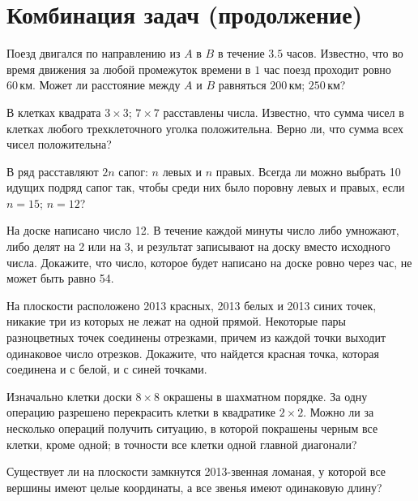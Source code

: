 
\section*{Комбинация задач (продолжение)}


\begin{problems}

\item 
Поезд двигался по направлению из $A$ в $B$ в течение $3.5$ часов.
Известно, что во время движения за любой промежуток времени в $1$ час поезд
проходит ровно $60\,\text{км}$.
Может ли расстояние между $A$ и $B$ равняться
\quad
\sp
$200\,\text{км}$;
\quad
\sp
$250\,\text{км}$?

\item 
В клетках квадрата
\quad
\sp $3 \times 3$;
\quad
\sp $7 \times 7$
\quad
расставлены числа.
Известно, что сумма чисел в клетках любого трехклеточного уголка положительна.
Верно ли, что сумма всех чисел положительна?

\item 
В ряд расставляют $2 n$ сапог: $n$ левых и $n$ правых.
Всегда ли можно выбрать 10 идущих подряд сапог так, чтобы среди них было
поровну левых и правых, если
\quad
\sp $n = 15$;
\quad
\sp $n = 12$?

\item 
На доске написано число 12.
В течение каждой минуты число либо умножают, либо делят на 2 или на 3, и
результат записывают на доску вместо исходного числа.
Докажите, что число, которое будет написано на доске ровно через час, не может
быть равно 54.

\item 
На плоскости расположено 2013 красных, 2013 белых и 2013 синих точек, никакие
три из которых не лежат на одной прямой.
Некоторые пары разноцветных точек соединены отрезками, причем из каждой точки
выходит одинаковое число отрезков.
Докажите, что найдется красная точка, которая соединена и с белой, и с синей
точками.

\item 
Изначально клетки доски $8 \times 8$ окрашены в шахматном порядке.
За одну операцию разрешено перекрасить клетки в квадратике $2 \times 2$.
Можно ли за несколько операций получить ситуацию, в которой покрашены черным
\quad
\sp все клетки, кроме одной;
\quad
\sp в точности все клетки одной главной диагонали?

\item 
Существует ли на плоскости замкнутся 2013-звенная ломаная, у которой все вершины
имеют целые координаты, а все звенья имеют одинаковую длину?


\end{problems}
